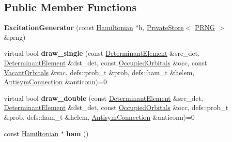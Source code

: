 \subsection*{Public Member Functions}
\begin{DoxyCompactItemize}
\item 
{\bfseries Excitation\+Generator} (const \hyperlink{classHamiltonian}{Hamiltonian} $\ast$h, \hyperlink{classPrivateStore}{Private\+Store}$<$ \hyperlink{classPRNG}{P\+R\+NG} $>$ \&prng)\hypertarget{classExcitationGenerator_a49314ec4f317bc05a590a58df558aa27}{}\label{classExcitationGenerator_a49314ec4f317bc05a590a58df558aa27}

\item 
virtual bool {\bfseries draw\+\_\+single} (const \hyperlink{classDeterminantElement}{Determinant\+Element} \&src\+\_\+det, \hyperlink{classDeterminantElement}{Determinant\+Element} \&dst\+\_\+det, const \hyperlink{structOccupiedOrbitals}{Occupied\+Orbitals} \&occ, const \hyperlink{structVacantOrbitals}{Vacant\+Orbitals} \&vac, defs\+::prob\+\_\+t \&prob, defs\+::ham\+\_\+t \&helem, \hyperlink{classAntisymConnection}{Antisym\+Connection} \&anticonn)=0\hypertarget{classExcitationGenerator_a86f874210eb5787bdaf8de158118bfb6}{}\label{classExcitationGenerator_a86f874210eb5787bdaf8de158118bfb6}

\item 
virtual bool {\bfseries draw\+\_\+double} (const \hyperlink{classDeterminantElement}{Determinant\+Element} \&src\+\_\+det, \hyperlink{classDeterminantElement}{Determinant\+Element} \&dst\+\_\+det, const \hyperlink{structOccupiedOrbitals}{Occupied\+Orbitals} \&occ, defs\+::prob\+\_\+t \&prob, defs\+::ham\+\_\+t \&helem, \hyperlink{classAntisymConnection}{Antisym\+Connection} \&anticonn)=0\hypertarget{classExcitationGenerator_ab87bd71e269a1c1205ae88c1cff935fc}{}\label{classExcitationGenerator_ab87bd71e269a1c1205ae88c1cff935fc}

\item 
const \hyperlink{classHamiltonian}{Hamiltonian} $\ast$ {\bfseries ham} ()\hypertarget{classExcitationGenerator_ad80becb637e39c2f70af2e1af0e8d628}{}\label{classExcitationGenerator_ad80becb637e39c2f70af2e1af0e8d628}

\end{DoxyCompactItemize}
